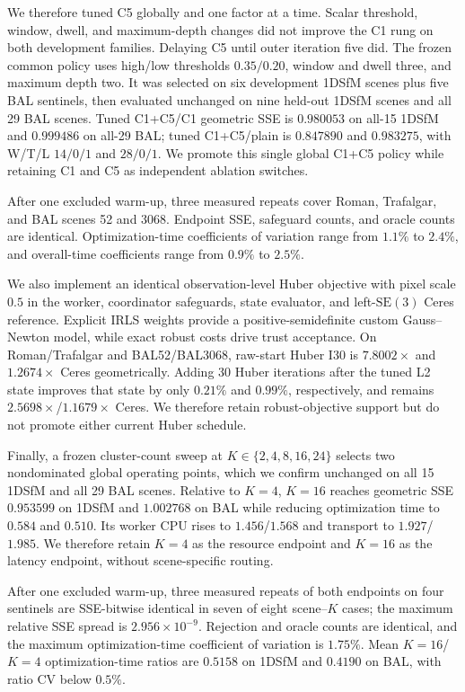 We therefore tuned C5 globally and one factor at a time.  Scalar threshold,
window, dwell, and maximum-depth changes did not improve the C1 rung on both
development families.  Delaying C5 until outer iteration five did.  The frozen
common policy uses high/low thresholds $0.35/0.20$, window and dwell three, and
maximum depth two.  It was selected on six development 1DSfM scenes plus five
BAL sentinels, then evaluated unchanged on nine held-out 1DSfM scenes and all
29 BAL scenes.  Tuned C1+C5/C1 geometric SSE is $0.980053$ on all-15 1DSfM and
$0.999486$ on all-29 BAL; tuned C1+C5/plain is $0.847890$ and $0.983275$, with
W/T/L $14/0/1$ and $28/0/1$.  We promote this single global C1+C5 policy while
retaining C1 and C5 as independent ablation switches.

After one excluded warm-up, three measured repeats cover Roman, Trafalgar, and
BAL scenes 52 and 3068.  Endpoint SSE, safeguard counts, and oracle counts are
identical.  Optimization-time coefficients of variation range from
$1.1\%$ to $2.4\%$, and overall-time coefficients range from $0.9\%$ to
$2.5\%$.

We also implement an identical observation-level Huber objective with pixel
scale $0.5$ in the worker, coordinator safeguards, state evaluator, and
left-$\mathrm{SE}(3)$ Ceres reference.  Explicit IRLS weights provide a
positive-semidefinite custom Gauss--Newton model, while exact robust costs drive
trust acceptance.  On Roman/Trafalgar and BAL52/BAL3068, raw-start Huber I30 is
$7.8002\times$ and $1.2674\times$ Ceres geometrically.  Adding 30 Huber
iterations after the tuned L2 state improves that state by only $0.21\%$ and
$0.99\%$, respectively, and remains $2.5698\times$/$1.1679\times$ Ceres.  We
therefore retain robust-objective support but do not promote either current
Huber schedule.

Finally, a frozen cluster-count sweep at $K\in\{2,4,8,16,24\}$ selects two
nondominated global operating points, which we confirm unchanged on all 15
1DSfM and all 29 BAL scenes.  Relative to $K=4$, $K=16$ reaches geometric SSE
$0.953599$ on 1DSfM and $1.002768$ on BAL while reducing optimization time to
$0.584$ and $0.510$.  Its worker CPU rises to $1.456$/$1.568$ and transport to
$1.927$/$1.985$.  We therefore retain $K=4$ as the resource endpoint and
$K=16$ as the latency endpoint, without scene-specific routing.

After one excluded warm-up, three measured repeats of both endpoints on four
sentinels are SSE-bitwise identical in seven of eight scene--$K$ cases; the
maximum relative SSE spread is $2.956\times10^{-9}$.  Rejection and oracle
counts are identical, and the maximum optimization-time coefficient of
variation is $1.75\%$.  Mean $K=16$/$K=4$ optimization-time ratios are $0.5158$
on 1DSfM and $0.4190$ on BAL, with ratio CV below $0.5\%$.

